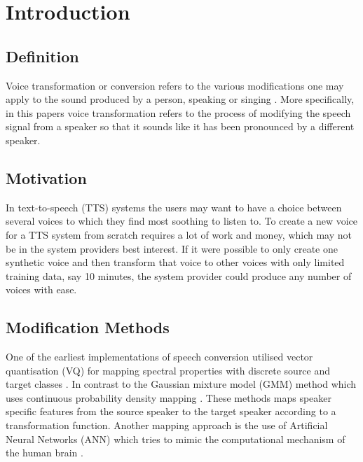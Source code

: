 \chapter{Introduction} %
\label{cha:introduction}


\section{Definition} %
\label{sec:definition}
Voice transformation or conversion refers to the various modifications one may apply to the sound produced by a person, speaking or singing \cite{stylianou08}. More specifically, in this papers voice transformation refers to the process of modifying the speech signal from a speaker so that it sounds like it has been pronounced by a different speaker. 

\section{Motivation} %
\label{sec:motivation}
In text-to-speech (TTS) systems the users may want to have a choice between several voices to which they find most soothing to listen to. To create a new voice for a TTS system from scratch requires a lot of work and money, which may not be in the system providers best interest. If it were possible to only create one synthetic voice and then transform that voice to other voices with only limited training data, say 10 minutes, the system provider could produce any number of voices with ease. 

\section{Modification Methods} %
\label{sec:synthesis_methods}
One of the earliest implementations of speech conversion utilised vector quantisation (VQ) for mapping spectral properties with discrete source and target classes \cite{abe88}. In contrast to the Gaussian mixture model (GMM) method which uses continuous probability density mapping \cite{stylianou98}. These methods maps speaker specific features from the source speaker to the target speaker according to a transformation function. Another mapping approach is the use of Artificial Neural Networks (ANN) \cite{desai09} which tries to mimic the computational mechanism of the human brain \cite{young75}. 


